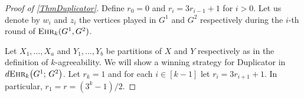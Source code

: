 \documentclass[12pt,notitlepage,a4paper]{article}
\theoremstyle{definition}
\newcommand{\ehr}{\textsc{Ehr}}
\begin{document}
\begin{proof}[Proof of \cref{ThmDuplicator}]
	Define $r_0=0$ and $r_i=3r_{i-1}+1$ for $i>0$.
	Let us denote by $w_i$ and $z_i$ the vertices played
	in $G^1$ and $G^2$ respectively during the $i$-th
	round of $\ehr_k(G^1,G^2)$. 
	\par
	
	Let $X_1,\dots,X_a$ and 
	$Y_1,\dots,Y_b$ be partitions of 
	$X$ and $Y$ respectively
	as in the definition of $k$-agreeability.
	We will show a winning strategy for Duplicator
	in $d\ehr_{k}\big(G^1;\, G^2\big)$.	
	Let $r_k=1$ and for each $i\in [k-1]$ 
	let $r_i=3r_{i+1}+1$. In particular, 
	$r_1=r=(3^k-1)/2$.
	

\end{proof}
\end{document}
